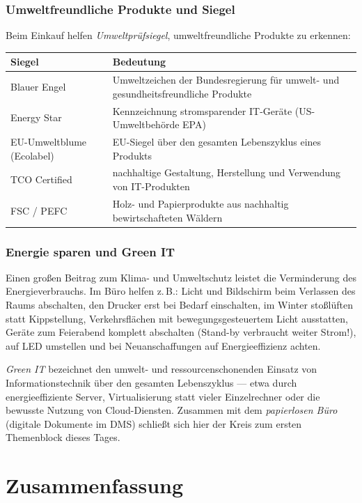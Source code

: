 \documentclass[11pt, a4paper]{article}
\begin{document}
\subsubsection{Umweltfreundliche Produkte und Siegel}

Beim Einkauf helfen \emph{Umweltprüfsiegel}, umweltfreundliche Produkte zu erkennen:

\begin{center}
\begin{tabular}{p{3.6cm} p{8.2cm}}
\toprule
\textbf{Siegel} & \textbf{Bedeutung}\\
\midrule
Blauer Engel & Umweltzeichen der Bundesregierung für umwelt- und gesundheitsfreundliche Produkte\\
Energy Star & Kennzeichnung stromsparender IT-Geräte (US-Umweltbehörde EPA)\\
EU-Umweltblume (Ecolabel) & EU-Siegel über den gesamten Lebenszyklus eines Produkts\\
TCO Certified & nachhaltige Gestaltung, Herstellung und Verwendung von IT-Produkten\\
FSC / PEFC & Holz- und Papierprodukte aus nachhaltig bewirtschafteten Wäldern\\
\bottomrule
\end{tabular}
\end{center}

\subsubsection{Energie sparen und Green IT}

Einen großen Beitrag zum Klima- und Umweltschutz leistet die Verminderung des
Energieverbrauchs. Im Büro helfen z.\,B.: Licht und Bildschirm beim Verlassen des Raums
abschalten, den Drucker erst bei Bedarf einschalten, im Winter stoßlüften statt
Kippstellung, Verkehrsflächen mit bewegungsgesteuertem Licht ausstatten, Geräte zum
Feierabend komplett abschalten (Stand-by verbraucht weiter Strom!), auf LED umstellen
und bei Neuanschaffungen auf Energieeffizienz achten.

\emph{Green IT} bezeichnet den umwelt- und ressourcenschonenden Einsatz von
Informationstechnik über den gesamten Lebenszyklus --- etwa durch energieeffiziente
Server, Virtualisierung statt vieler Einzelrechner oder die bewusste Nutzung von
Cloud-Diensten. Zusammen mit dem \emph{papierlosen Büro} (digitale Dokumente im DMS)
schließt sich hier der Kreis zum ersten Themenblock dieses Tages.

\section{Zusammenfassung}
\end{document}
